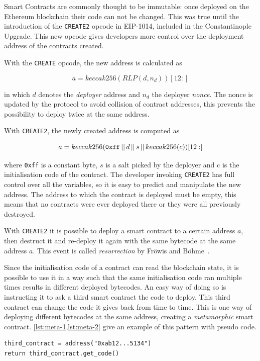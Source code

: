 Smart Contracts are commonly thought to be immutable: once deployed on the Ethereum blockchain their code can not be changed. This was true until the introduction of the {\tt CREATE2} opcode in EIP-1014, included in the Constantinople Upgrade. This new opcode gives developers more control over the deployment address of the contracts created. 

With the {\tt CREATE} opcode, the new address is calculated as

\[a=keccak256(RLP(d,n_d))[12:] \]

in which $d$ denotes the \textit{deployer} address and $n_d$ the deployer \textit{nonce}. The nonce is updated by the protocol to avoid collision of contract addresses, this prevents the possibility to deploy twice at the same address.

With {\tt CREATE2}, the newly created address is computed as

\[a=keccak256({\tt 0xff}\,||\,d\,||\,s\,||\,keccak256(c))[12:]\]

where {\tt 0xff} is a constant byte, $s$ is a salt picked by the deployer and c is the initialisation code of the contract. The developer invoking {\tt CREATE2} has full control over all the variables, so it is easy to predict and manipulate the new address. The address to which the contract is deployed must be empty, this means that no contracts were ever deployed there or they were all previously destroyed.

With {\tt CREATE2} it is possible to deploy a smart contract to a certain address $a$, then destruct it and re-deploy it again with the same bytecode at the same address $a$. This event is called \textit{resurrection} by Fröwis and Böhme~\cite{create2-metamorphic}. 

Since the initialisation code of a contract can read the blockchain state, it is possible to use it in a way such that the same initialisation code ran multiple times results in different deployed bytecodes. An easy way of doing so is instructing it to ask a third smart contract the code to deploy. This third contract can change the code it gives back from time to time. This is one way of deploying different bytecodes at the same address, creating a \textit{metamorphic} smart contract. \cref{lst:meta-1,lst:meta-2} give an example of this pattern with pseudo code.

\begin{lstlisting}[label={lst:meta-1},caption={Pseudo initialization code that deploys bytecode read from another contract.}]
third_contract = address("0xab12...5134")
return third_contract.get_code()
\end{lstlisting}

